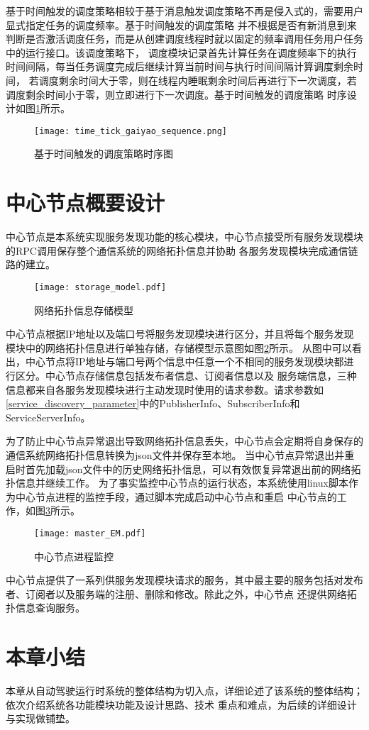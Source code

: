 基于时间触发的调度策略相较于基于消息触发调度策略不再是侵入式的，需要用户显式指定任务的调度频率。基于时间触发的调度策略
并不根据是否有新消息到来判断是否激活调度任务，而是从创建调度线程时就以固定的频率调用任务用户任务中的运行接口。该调度策略下，
调度模块记录首先计算任务在调度频率下的执行时间间隔，每当任务调度完成后继续计算当前时间与执行时间间隔计算调度剩余时间，
若调度剩余时间大于零，则在线程内睡眠剩余时间后再进行下一次调度，若调度剩余时间小于零，则立即进行下一次调度。基于时间触发的调度策略
时序设计如图\ref{time_tick_gaiyao_sequence}所示。
\begin{figure}[H]
  \centering
  \texttt{[image: time\_tick\_gaiyao\_sequence.png]}
  \caption{基于时间触发的调度策略时序图}
  \label{time_tick_gaiyao_sequence}
\end{figure}

\section{中心节点概要设计}
中心节点是本系统实现服务发现功能的核心模块，中心节点接受所有服务发现模块的RPC调用保存整个通信系统的网络拓扑信息并协助
各服务发现模块完成通信链路的建立。

\begin{figure}[htb]
  \centering
  \texttt{[image: storage\_model.pdf]}
  \caption{网络拓扑信息存储模型}
  \label{storage_model}
\end{figure}

中心节点根据IP地址以及端口号将服务发现模块进行区分，并且将每个服务发现模块中的网络拓扑信息进行单独存储，存储模型示意图如图\ref{storage_model}所示。
从图中可以看出，中心节点将IP地址与端口号两个信息中任意一个不相同的服务发现模块都进行区分。中心节点存储信息包括发布者信息、订阅者信息以及
服务端信息，三种信息都来自各服务发现模块进行主动发现时使用的请求参数。请求参数如\ref{service_discovery_parameter}中的PublisherInfo、SubscriberInfo和
ServiceServerInfo。

为了防止中心节点异常退出导致网络拓扑信息丢失，中心节点会定期将自身保存的通信系统网络拓扑信息转换为json文件并保存至本地。
当中心节点异常退出并重启时首先加载json文件中的历史网络拓扑信息，可以有效恢复异常退出前的网络拓扑信息并继续工作。
为了事实监控中心节点的运行状态，本系统使用linux脚本作为中心节点进程的监控手段，通过脚本完成启动中心节点和重启
中心节点的工作，如图\ref{master_EM}所示。
\begin{figure}[htb]
  \centering
  \texttt{[image: master\_EM.pdf]}
  \caption{中心节点进程监控}
  \label{master_EM}
\end{figure}

中心节点提供了一系列供服务发现模块请求的服务，其中最主要的服务包括对发布者、订阅者以及服务端的注册、删除和修改。除此之外，中心节点
还提供网络拓扑信息查询服务。


\section{本章小结}
本章从自动驾驶运行时系统的整体结构为切入点，详细论述了该系统的整体结构；依次介绍系统各功能模块功能及设计思路、技术
重点和难点，为后续的详细设计与实现做铺垫。




